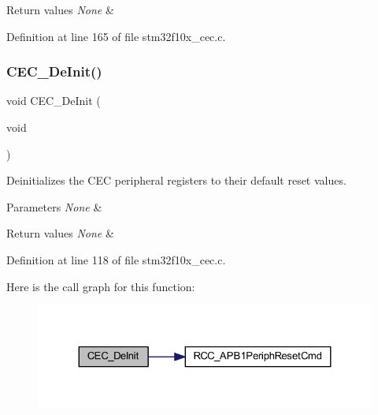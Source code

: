 \begin{DoxyRetVals}{Return values}
{\em None} & \\
\hline
\end{DoxyRetVals}


Definition at line 165 of file stm32f10x\+\_\+cec.\+c.

\mbox{\label{group___c_e_c___exported___functions_ga604c3b15b51a46303c201fa3deac2212}} 
\subsubsection{\texorpdfstring{C\+E\+C\+\_\+\+De\+Init()}{CEC\_DeInit()}}
{\footnotesize\ttfamily void C\+E\+C\+\_\+\+De\+Init (\begin{DoxyParamCaption}\item[{void}]{ }\end{DoxyParamCaption})}



Deinitializes the C\+EC peripheral registers to their default reset values. 


\begin{DoxyParams}{Parameters}
{\em None} & \\
\hline
\end{DoxyParams}

\begin{DoxyRetVals}{Return values}
{\em None} & \\
\hline
\end{DoxyRetVals}


Definition at line 118 of file stm32f10x\+\_\+cec.\+c.

Here is the call graph for this function\+:
\nopagebreak
\begin{figure}[H]
\begin{center}
\leavevmode
\includegraphics[width=324pt]{group___c_e_c___exported___functions_ga604c3b15b51a46303c201fa3deac2212_cgraph}
\end{center}
\end{figure}
\mbox{\label{group___c_e_c___exported___functions_ga1e2cf6e3a1ac891f2814f9d3f4043574}} 
